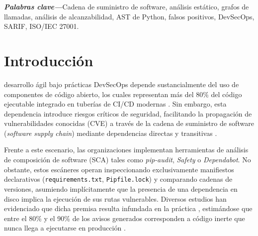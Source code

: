 \documentclass[conference]{IEEEtran}
\begin{document}
\vspace{0.1cm}
\noindent\textbf{\textit{Palabras clave---}}Cadena de suministro de software, análisis estático, grafos de llamadas, análisis de alcanzabilidad, AST de Python, falsos positivos, DevSecOps, SARIF, ISO/IEC 27001.

\section{Introducción}
 desarrollo ágil bajo prácticas DevSecOps depende sustancialmente del uso de componentes de código abierto, los cuales representan más del 80\% del código ejecutable integrado en tuberías de CI/CD modernas \cite{synopsys2024ossra, decan2019empirical}. Sin embargo, esta dependencia introduce riesgos críticos de seguridad, facilitando la propagación de vulnerabilidades conocidas (CVE) a través de la cadena de suministro de software (\textit{software supply chain}) mediante dependencias directas y transitivas \cite{ladisa2023sok, alfadel2023empirical, chinthanet2023lag}.

Frente a este escenario, las organizaciones implementan herramientas de análisis de composición de software (SCA) tales como \textit{pip-audit}, \textit{Safety} o \textit{Dependabot}. No obstante, estos escáneres operan inspeccionando exclusivamente manifiestos declarativos (\texttt{requirements.txt}, \texttt{Pipfile.lock}) y comparando cadenas de versiones, asumiendo implícitamente que la presencia de una dependencia en disco implica la ejecución de sus rutas vulnerables. Diversos estudios han evidenciado que dicha premisa resulta infundada en la práctica \cite{pashchenko2022vuln4real, dann2021identifying, duan2023towards}, estimándose que entre el 80\% y el 90\% de los avisos generados corresponden a código inerte que nunca llega a ejecutarse en producción \cite{pashchenko2022vuln4real, ponta2020detection, prana2022empirical}.
\end{document}
